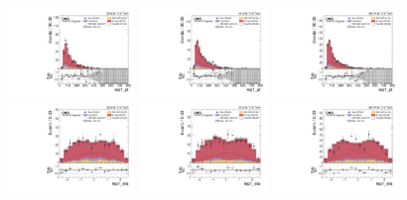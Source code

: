 \begin{figure}[!ht]
  \centering
  \includegraphics[width=0.30\textwidth]{analysis_plots/2016_zv/cr_vjets_m/lep1_pt.pdf}
  \includegraphics[width=0.30\textwidth]{analysis_plots/2017_zv/cr_vjets_m/lep1_pt.pdf}
  \includegraphics[width=0.30\textwidth]{analysis_plots/2018_zv/cr_vjets_m/lep1_pt.pdf} \\
  \includegraphics[width=0.30\textwidth]{analysis_plots/2016_zv/cr_vjets_m/lep1_eta.pdf}
  \includegraphics[width=0.30\textwidth]{analysis_plots/2017_zv/cr_vjets_m/lep1_eta.pdf}
  \includegraphics[width=0.30\textwidth]{analysis_plots/2018_zv/cr_vjets_m/lep1_eta.pdf} \\

\end{figure}
